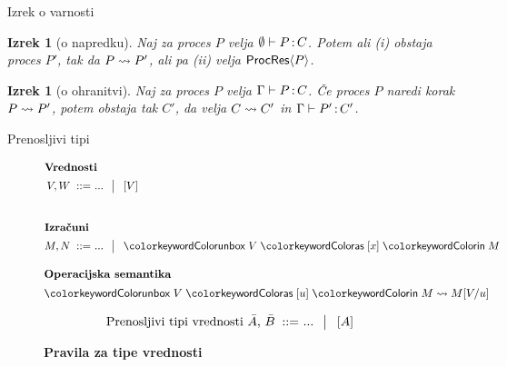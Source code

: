 \documentclass{beamer}
\theoremstyle{definition} %
\theoremstyle{plain} %
\newtheorem{izrek}[definicija]{Izrek}
\begin{document}
	

	
	\begin{frame}{Izrek o varnosti}			
		\begin{izrek}[o napredku]\label{izr:napredek}
			Naj za proces $P$ velja $\emptyset \vdash P \mathinner{:} C$. Potem ali (i) obstaja proces $P'$, tak da $P \leadsto P'$, ali pa (ii) velja $\mathsf{ProcRes}\langle P \rangle$.
		\end{izrek}
	
		\begin{izrek}[o ohranitvi]\label{izr:ohranitev}
			Naj za proces $P$ velja $\Gamma \vdash P \mathinner{:} C$. Če proces $P$ naredi korak $P \leadsto P'$, potem obstaja tak $C'$, da velja $C \rightsquigarrow C'$ in $\Gamma \vdash P' \mathinner{:} C'$.
		\end{izrek}
	\end{frame}




	\begin{frame}{Prenosljivi tipi}

		\begin{figure}[hp]
			\parbox{\textwidth}{
				\centering
				\tiny
				\begin{align*}
				\shortintertext{\textbf{Vrednosti}}
				V, W
				\bnfis & ... \,\bnfor\! \tmboxed{V}     
				\\[5ex]
				\shortintertext{\textbf{Izračuni}}
				M, N
				\bnfis & ... \,\bnfor\! \tmunbox{V}{x}{M}
				\end{align*}
			} 
		\end{figure}
		
		\begin{figure}[tp]
			\centering
			\tiny
			\begin{align*}
			\shortintertext{\textbf{Operacijska semantika}}
			\tmunbox{V}{u}{M} & \reduces M[V/u]
			\end{align*}
		\end{figure}
	
		\begin{figure}[tb]
			\parbox{\textwidth}{
				\centering
				\tiny
				\begin{align*}
				\text{Prenosljivi tipi vrednosti $\bar{A}$, $\bar{B}$}
				\mathrel{\;{:}{:}{=}\ } & ... \,\mathrel{\;\big|\ \ }\! [A]
				\end{align*}
			} 
		\end{figure}
	
		
		\begin{figure}[tp]
			\centering
			\tiny
			\textbf{Pravila za tipe vrednosti}
			\begin{mathpar}
			\end{mathpar}
		\end{figure}
		
	\end{frame}
\end{document}
